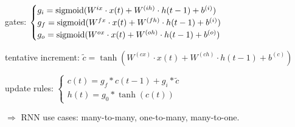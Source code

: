 gates: $\begin{cases}
g_i = \mathrm{sigmoid}{(W^{ix}\cdot x(t) + W^{(ih)}\cdot h(t-1) + b^{(i)})} \\
g_f = \mathrm{sigmoid}{(W^{fx}\cdot x(t) + W^{(fh)}\cdot h(t-1) + b^{(i)})} \\
g_o = \mathrm{sigmoid}{(W^{ox}\cdot x(t) + W^{(oh)}\cdot h(t-1) + b^{(o)})}
\end{cases}$

tentative increment: $\tilde{c} = \tanh{(W^{(cx)}\cdot x(t) + W^{(ch)}\cdot h(t-1) + b^{(c)})}$

update rules: $\begin{cases}
c(t) = g_f * c(t-1) + g_i *\tilde{c} \\
h(t) = g_0 * \tanh{(c(t))}
\end{cases}$

$\Rightarrow$ RNN use cases: many-to-many, one-to-many, many-to-one.